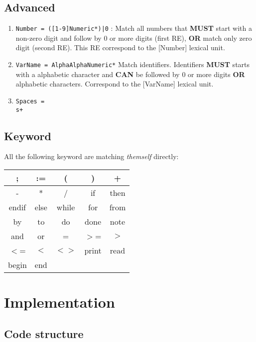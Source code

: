 \documentclass[letterpaper]{article}
\begin{document}
\subsection{Advanced}
\label{advanced-ere}
\begin{enumerate}
    \item \texttt{Number = ([1-9]{Numeric}*)|0} :
    Match all numbers that \textbf{MUST} start with a non-zero digit and follow
    by 0 or more digits (first RE),
    \textbf{OR} match only zero digit (second RE). This RE correspond to
    the [Number] lexical unit.
    \item \texttt{VarName = {Alpha}{AlphaNumeric}*}
    Match identifiers. Identifiers \textbf{MUST} starts with a alphabetic
    character and \textbf{CAN} be followed by 0 or more digits \textbf{OR}
    alphabetic characters.
    Correspond to the [VarName] lexical unit.
    \item \texttt{Spaces = \\s+}
\end{enumerate}

\subsection{Keyword}

\label{ere-keywords}

All the following keyword are matching \textit{themself} directly: \\

\begin{tabular}{|c|c|c|c|c|}
    \hline
    ; & := & ( & )  & + \\
    \hline
    - & *  & / & if & then \\
    \hline
    endif & else & while & for & from \\
    \hline
    by & to & do & done & note \\
    \hline
    and & or & = & $>$= & $>$ \\
    \hline
    $<$= & $<$ & $<>$ & print & read \\
    \hline
    begin & end & & &  \\
    \hline
\end{tabular}



\section{Implementation}

\subsection{Code structure}
\end{document}
